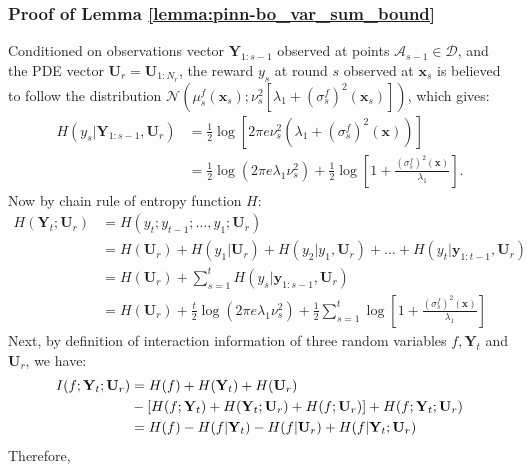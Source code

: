 \subsubsection{Proof of Lemma \ref{lemma:pinn-bo_var_sum_bound}}
Conditioned on observations vector $\mathbf{Y}_{1:s-1}$  observed at points $\mathcal{A}_{s-1} \in \mathcal{D}$, and the PDE vector $\mathbf{U}_r = \mathbf{U}_{1:N_r}$, the reward $y_s$ at round $s$ observed at
$\mathbf{x}_s$ is believed to follow the distribution $\mathcal{N}\left(\mu_s^f(\mathbf{x}_s); \nu_s^2[\lambda_1 + \left(\sigma_s^f\right)^2(\mathbf{x}_s)]\right)$, which gives:
\begin{align*}
H(y_s \rvert \mathbf{Y}_{1:s-1}, \mathbf{U}_r) &= \frac{1}{2} \log\left[ 2\pi e \nu_s^2\left(\lambda_1 + \left(\sigma_s^f\right)^2(\mathbf{x}) \right) \right]\\
&=\frac{1}{2}\log(2\pi e \lambda_1\nu_s^2) + \frac{1}{2} \log \left[1+ \frac{\left(\sigma_s^f\right)^2(\mathbf{x})}{\lambda_1}\right].
\end{align*}
Now by chain rule of entropy function $H$: 
\begin{align}
    H(\mathbf{Y}_t; \mathbf{U}_r) &= H(y_t; y_{t-1};\dots, y_1; \mathbf{U}_r) \nonumber
    \\
    &= H(\mathbf{U}_r) + H(y_1 \rvert \mathbf{U}_r) + H(y_2\rvert y_1, \mathbf{U}_r) + \dots + H (y_t \rvert \mathbf{y}_{1:t-1}, \mathbf{U}_r) \nonumber
    \\
    &= H(\mathbf{U}_r) + \sum_{s=1}^t H(y_s \rvert \mathbf{y}_{1:s-1}, \mathbf{U}_r) \nonumber
    \\ 
    & = H(\mathbf{U}_r) + \frac{t}{2}\log(2\pi e \lambda_1\nu_s^2) + \frac{1}{2}\sum_{s=1}^t \log \left[1+ \frac{\left(\sigma_s^f\right)^2(\mathbf{x})}{\lambda_1}\right] \label{Eqn:joint_entropy_Yt_Ur}
\end{align}
Next, by definition of interaction information of three random variables $f, \mathbf{Y}_t$ and $\mathbf{U}_r$, we have: 
    \begin{align*}
        I(f; \mathbf{Y}_t; \mathbf{U}_r) &= H(f) + H(\mathbf{Y}_t) + H(\mathbf{U}_r) \notag \\
        & - [H(f; \mathbf{Y}_t) + H(\mathbf{Y}_t; \mathbf{U}_r) + H(f; \mathbf{U}_r)] + H (f; \mathbf{Y}_t; \mathbf{U}_r)
        \\
        &= H(f) - H(f \rvert \mathbf{Y}_t) - H(f \rvert \mathbf{U}_r) + H(f \rvert \mathbf{Y}_t; \mathbf{U}_r)
    \end{align*}
    Therefore,  
